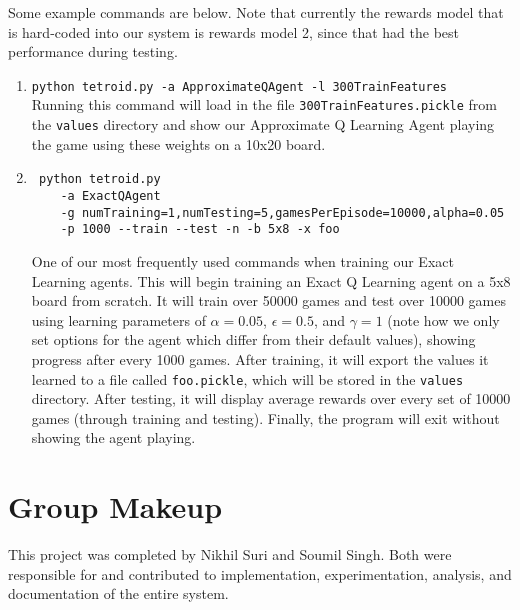 \documentclass[11pt]{article}
\begin{document}
Some example commands are below. Note that currently the rewards model  that is hard-coded into our system is rewards model 2, since that had the best performance during testing.
\begin{enumerate}
    \item \texttt{python tetroid.py -a ApproximateQAgent -l 300TrainFeatures}\\ Running this command will load in the file \texttt{300TrainFeatures.pickle} from the \texttt{values} directory and show our Approximate Q Learning Agent playing the game using these weights on a 10x20 board.
    \item \begin{verbatim} python tetroid.py
    -a ExactQAgent
    -g numTraining=1,numTesting=5,gamesPerEpisode=10000,alpha=0.05
    -p 1000 --train --test -n -b 5x8 -x foo
    \end{verbatim}
    One of our most frequently used commands when training our Exact Learning agents. This will begin training an Exact Q Learning agent on a 5x8 board from scratch. It will train over 50000 games and test over 10000 games using learning parameters of $\alpha=0.05$, $\epsilon=0.5$, and $\gamma=1$ (note how we only set options for the agent which differ from their default values), showing progress after every 1000 games. After training, it will export the values it learned to a file called \texttt{foo.pickle}, which will be stored in the \texttt{values} directory. After testing, it will display average rewards over every set of 10000 games (through training and testing). Finally, the program will exit without showing the agent playing.
\end{enumerate}

\section{Group Makeup}
This project was completed by Nikhil Suri and Soumil Singh. Both were responsible for and contributed to implementation, experimentation, analysis, and documentation of the entire system.



\end{document}
